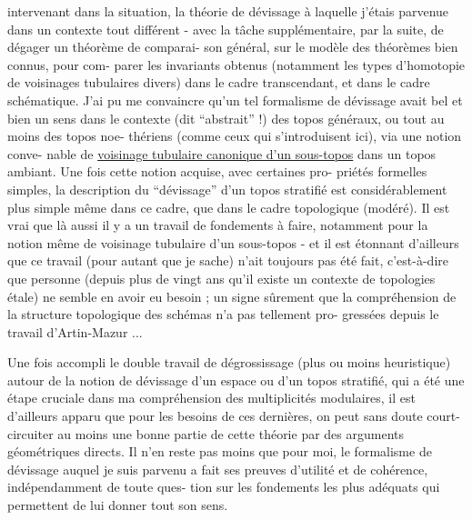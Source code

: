 
intervenant dans la situation, la théorie de dévissage à laquelle
j'étais parvenue dans un contexte tout différent - avec la tâche
supplémentaire, par la suite, de dégager un théorème de comparai-%
son général, sur le modèle des théorèmes bien connus, pour com-%
parer les invariants obtenus (notamment les types d'homotopie de
voisinages tubulaires divers) dans le cadre transcendant, et dans
le cadre schématique. J'ai pu me convaincre qu'un tel formalisme
de dévissage avait bel et bien un sens dans le contexte (dit
``abstrait'' !) des topos généraux, ou tout au moins des topos noe-%
thériens (comme ceux qui s'introduisent ici), via une notion conve-%
nable de \uline{voisinage tubulaire canonique d'un sous-topos} dans un
topos ambiant. Une fois cette notion acquise, avec certaines pro-%
priétés formelles simples, la description du ``dévissage'' d'un
topos stratifié est considérablement plus simple même dans ce
cadre, que dans le cadre topologique (modéré). Il est vrai que
là aussi il y a un travail de fondements à faire, notamment pour
la notion même de voisinage tubulaire d'un sous-topos - et il est
étonnant d'ailleurs que ce travail (pour autant que je sache)
n'ait toujours pas été fait, c'est-à-dire que personne (depuis plus
de vingt ans qu'il existe un contexte de topologies étale) ne
semble en avoir eu besoin ; un signe sûrement que la compréhension
de la structure topologique des schémas n'a pas tellement pro-%
gressées depuis le travail d'Artin-Mazur ...

Une fois accompli le double travail de dégrossissage
(plus ou moins heuristique) autour de la notion de dévissage d'un
espace ou d'un topos stratifié, qui a été une étape cruciale dans
ma compréhension des multiplicités modulaires, il est d'ailleurs
apparu que pour les besoins de ces dernières, on peut sans doute
court-circuiter au moins une bonne partie de cette théorie par des
arguments géométriques directs. Il n'en reste pas moins que pour
moi, le formalisme de dévissage auquel je suis parvenu a fait ses
preuves d'utilité et de cohérence, indépendamment de toute ques-%
tion sur les fondements les plus adéquats qui permettent de lui
donner tout son sens.

